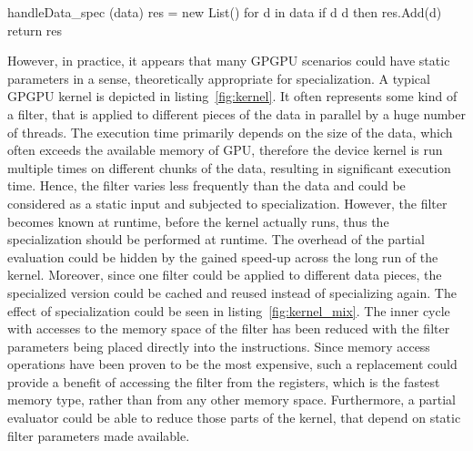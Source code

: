 \begin{listing}
    \begin{pyglist}[language = Java, label = fig:kernel_mix,caption={ A typical GPGPU kernel specialization with respect to {[2;3]}}]
handleData_spec (data) {
    res = new List()
    for d in data
        if d %
        d %
        then res.Add(d)
  return res
}
    \end{pyglist}
\end{listing}


However, in practice, it appears that many GPGPU scenarios could have static parameters in a sense, theoretically appropriate for specialization.
A typical GPGPU kernel is depicted in listing~\ref{fig:kernel}.
It often represents some kind of a filter, that is applied to different pieces of the data in parallel by a huge number of threads.
The execution time primarily depends on the size of the data, which often exceeds the available memory of GPU, therefore the device kernel is run multiple times on different chunks of the data, resulting in significant execution time.
Hence, the filter varies less frequently than the data and could be considered as a static input and subjected to specialization.
However, the filter becomes known at runtime, before the kernel actually runs, thus the specialization should be performed at runtime.
The overhead of the partial evaluation could be hidden by the gained speed-up across the long run of the kernel.
Moreover, since one filter could be applied to different data pieces, the specialized version could be cached and reused instead of specializing again. The effect of specialization could be seen in listing~\ref{fig:kernel_mix}.
The inner cycle with accesses to the memory space of the filter has been reduced with the filter parameters being placed directly into the instructions.
Since memory access operations have been proven to be the most expensive, such a replacement could provide a benefit of accessing the filter from the registers, which is the fastest memory type, rather than from any other memory space.
Furthermore, a partial evaluator could be able to reduce those parts of the kernel, that depend on static filter parameters made available.

